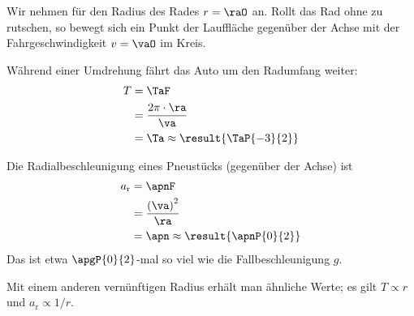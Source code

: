 Wir nehmen für den Radius des Rades $r = \raO$ an. Rollt das Rad ohne zu rutschen, so bewegt sich ein Punkt der Lauffläche gegenüber der Achse mit der Fahrgeschwindigkeit $v = \vaO$ im Kreis.
\begin{abcliste}
\abc Während einer Umdrehung fährt das Auto um den Radumfang weiter:
\begin{align}
 T &= \TaF \\
   &= \frac{2\pi\cdot\ra}{\va} \\
   &= \Ta \approx \result{\TaP{-3}{2}}
\end{align}

\abc Die Radialbeschleunigung eines Pneustücks (gegenüber der Achse) ist
\begin{align}
 a_\text{r} &= \apnF \\
   &= \frac{\left(\va\right)^2}{\ra} \\
   &= \apn \approx \result{\apnP{0}{2}}
\end{align}
Das ist etwa $\apgP{0}{2}$-mal so viel wie die Fallbeschleunigung $g$.
\end{abcliste}
Mit einem anderen vernünftigen Radius erhält man ähnliche Werte; es gilt $T \propto r$ und $a_\text{r} \propto 1/r$.
